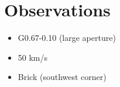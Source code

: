 \section{Observations}

\begin{itemize}
\item G0.67-0.10 (large aperture)
\item 50 km/s 
\item Brick (southwest corner)
\end{itemize}

